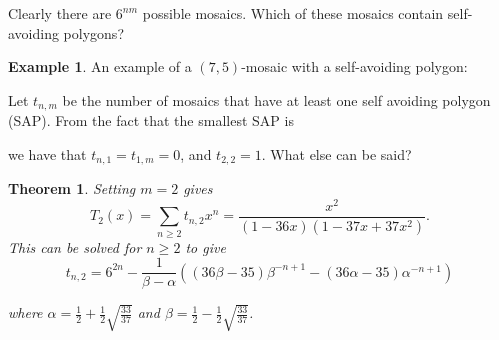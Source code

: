 \documentclass[12pt]{article}
\newtheorem{theorem}{Theorem}
\theoremstyle{plain}
\theoremstyle{definition}
\theoremstyle{remark}
\theoremstyle{definition}
\newtheorem{exmp}{Example}[section]
\newcommand{\cellA}[4]{\draw[red, thick, densely dotted] ( #1 + 0.5 , #2 ) arc(0:90:{0.5}); \draw[thick] ( #1 , #2 ) rectangle ( #3 , #4 );}
\newcommand{\cellB}[4]{\draw[red, thick, densely dotted] ( #1 + 1 , #2 + 0.5 ) arc(90:180:{0.5}); \draw[thick] ( #1 , #2 ) rectangle ( #3 , #4 );}
\newcommand{\cellC}[4]{\draw[red, thick, densely dotted] ( #1 + 0.5, #2 + 1 ) arc(180:270:{0.5}); \draw[thick] ( #1 , #2 ) rectangle ( #3 , #4 );}
\newcommand{\cellD}[4]{\draw[red, thick, densely dotted] ( #1 , #2 + 0.5 ) arc(-90:0:{0.5}); \draw[thick] ( #1 , #2 ) rectangle ( #3 , #4 );}
\newcommand{\cellE}[4]{\draw[red, thick, densely dotted] (#3, #4 * 0.5 + #2 * 0.5) -- (#1, #4 * 0.5 + #2 * 0.5); \draw[thick] ( #1 , #2 ) rectangle ( #3 , #4 );}
\newcommand{\cellF}[4]{\draw[red, thick, densely dotted] (#3 * 0.5 + #1 * 0.5 , #2) -- (#3 * 0.5 + #1 * 0.5 , #4); \draw[thick] ( #1 , #2 ) rectangle ( #3 , #4 );}
\newcommand{\cellAf}[4]{\filldraw[gray!40] ( #1 , #2 ) rectangle ( #3 , #4 ); \draw[red, thick, densely dotted] ( #1 + 0.5 , #2 ) arc(0:90:{0.5}); \draw[thick] ( #1 , #2 ) rectangle ( #3 , #4 );}
\newcommand{\cellBf}[4]{\filldraw[gray!40] ( #1 , #2 ) rectangle ( #3 , #4 ); \draw[red, thick, densely dotted] ( #1 + 1 , #2 + 0.5 ) arc(90:180:{0.5}); \draw[thick] ( #1 , #2 ) rectangle ( #3 , #4 );}
\newcommand{\cellCf}[4]{\filldraw[gray!40] ( #1 , #2 ) rectangle ( #3 , #4 ); \draw[red, thick, densely dotted] ( #1 + 0.5, #2 + 1 ) arc(180:270:{0.5}); \draw[thick] ( #1 , #2 ) rectangle ( #3 , #4 );}
\newcommand{\cellDf}[4]{\filldraw[gray!40] ( #1 , #2 ) rectangle ( #3 , #4 ); \draw[red, thick, densely dotted] ( #1 , #2 + 0.5 ) arc(-90:0:{0.5}); \draw[thick] ( #1 , #2 ) rectangle ( #3 , #4 );}
\newcommand{\cellEf}[4]{\filldraw[gray!40] ( #1 , #2 ) rectangle ( #3 , #4 ); \draw[red, thick, densely dotted] (#3, #4 * 0.5 + #2 * 0.5) -- (#1, #4 * 0.5 + #2 * 0.5); \draw[thick] ( #1 , #2 ) rectangle ( #3 , #4 );}
\begin{document}
Clearly there are $6^{nm}$ possible mosaics. Which of these mosaics contain self-avoiding polygons?

\begin{exmp}
An example of a $(7,5)$-mosaic with a self-avoiding polygon:
\begin{center}
\end{center}
\end{exmp}

Let $t_{n,m}$ be the number of mosaics that have at least one self avoiding polygon (SAP). From the fact that the smallest SAP is

\begin{center}
\end{center}

we have that $t_{n,1}=t_{1,m}=0$, and $t_{2,2} = 1$. What else can be said?

\begin{theorem}\label{thm: m=2 case}
Setting $m=2$ gives
\begin{equation}
    T_2(x) = \sum_{n \geq 2}t_{n,2}x^n = \frac{x^2}{(1-36x)(1-37x+37x^2)}.
\end{equation}
This can be solved for $n \geq 2$ to give
\begin{equation}
     t_{n,2}= 6^{2n} - \frac{1}{\beta-\alpha}((36\beta-35)\beta^{-n+1} - (36\alpha - 35)\alpha^{-n+1})
\end{equation}

where $\alpha = \frac{1}{2} + \frac{1}{2}\sqrt{\frac{33}{37}}$ and $\beta = \frac{1}{2} - \frac{1}{2}\sqrt{\frac{33}{37}}$.
\end{theorem}
\end{document}
